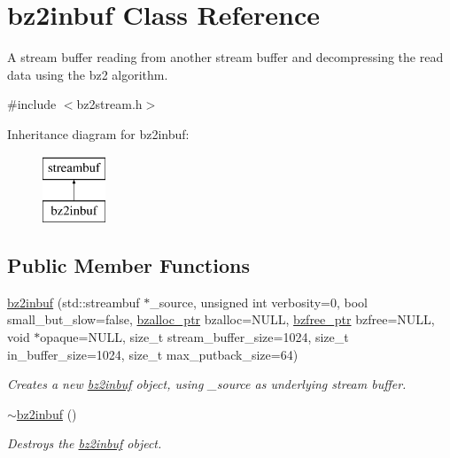 \hypertarget{classbz2inbuf}{}\section{bz2inbuf Class Reference}
\label{classbz2inbuf}


A stream buffer reading from another stream buffer and decompressing the read data using the bz2 algorithm.  




{\ttfamily \#include $<$bz2stream.\+h$>$}

Inheritance diagram for bz2inbuf\+:\begin{figure}[H]
\begin{center}
\leavevmode
\includegraphics[height=2.000000cm]{classbz2inbuf}
\end{center}
\end{figure}
\subsection*{Public Member Functions}
\begin{DoxyCompactItemize}
\item 
\hyperlink{classbz2inbuf_a25f60f9742732d40bff5d5c01f93b8c3}{bz2inbuf} (std\+::streambuf $\ast$\+\_\+source, unsigned int verbosity=0, bool small\+\_\+but\+\_\+slow=false, \hyperlink{bz2stream_8h_ad84a886ecf0c0c00445cdd219beb6a7b}{bzalloc\+\_\+ptr} bzalloc=N\+U\+L\+L, \hyperlink{bz2stream_8h_a3ae1e0ffde629a32e954abecc8cd7bb2}{bzfree\+\_\+ptr} bzfree=N\+U\+L\+L, void $\ast$opaque=N\+U\+L\+L, size\+\_\+t stream\+\_\+buffer\+\_\+size=1024, size\+\_\+t in\+\_\+buffer\+\_\+size=1024, size\+\_\+t max\+\_\+putback\+\_\+size=64)
\begin{DoxyCompactList}\small\item\em Creates a new \hyperlink{classbz2inbuf}{bz2inbuf} object, using \+\_\+source as underlying stream buffer. \end{DoxyCompactList}\item 
\hyperlink{classbz2inbuf_aed0e9c30edf7773d72a207411a6543d0}{$\sim$bz2inbuf} ()
\begin{DoxyCompactList}\small\item\em Destroys the \hyperlink{classbz2inbuf}{bz2inbuf} object. \end{DoxyCompactList}\end{DoxyCompactItemize}
